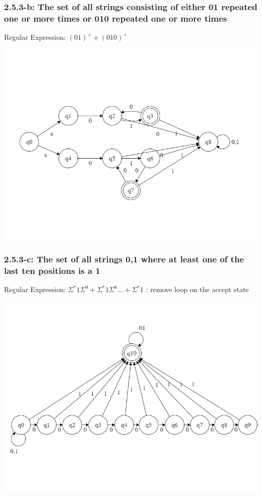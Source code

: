 \documentclass{article}
\theoremstyle{theorem}
\theoremstyle{definition}
\theoremstyle{remark}
\begin{document}
\subsubsection{2.5.3-b: The set of all strings consisting of either 01 repeated one or more times or 010 repeated one or more times}
Regular Expression: $(01)^++(010)^+$

\includegraphics[scale=0.4]{Images/2.5.3b.png}

\subsubsection{2.5.3-c: The set of all strings {0,1} where at least one of the last ten positions is a 1}
Regular Expression: $\Sigma^*1\Sigma^9+\Sigma^*1\Sigma^8...+\Sigma^*1$ : remove loop on the accept state

\includegraphics[scale=0.4]{Images/2.5.3c.png}
\end{document}
